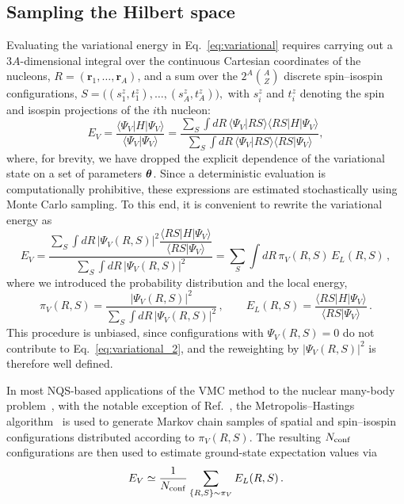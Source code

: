 \subsection{Sampling the Hilbert space }
Evaluating the variational energy in Eq.~\eqref{eq:variational} requires
carrying out a $3A$-dimensional integral over the continuous Cartesian
coordinates of the nucleons,
$R = (\mathbf{r}_1, \ldots, \mathbf{r}_A)$,
and a sum over the $2^A \binom{A}{Z}$ discrete spin--isospin configurations,
$S=\big((s_1^z, t_1^z), \ldots, (s_A^z, t_A^z)\big),$
with $s_i^z$ and $t_i^z$ denoting the spin and isospin projections of the $i$th nucleon:
\begin{equation}
E_V =
\frac{\langle \Psi_V | H | \Psi_V \rangle}{\langle \Psi_V | \Psi_V\rangle}
= \frac{\sum_{S} \int dR\, \langle \Psi_V | R S\rangle \langle R S | H | \Psi_V\rangle}
{\sum_{S} \int dR\, \langle \Psi_V | R S\rangle \langle R S | \Psi_V\rangle},
\label{eq:variational_2}
\end{equation}
where, for brevity, we have dropped the explicit dependence of the variational state on a set of parameters $\boldsymbol{\theta}$. Since a deterministic evaluation is computationally prohibitive, these expressions are estimated stochastically using Monte Carlo sampling. To this end, it is convenient to rewrite the variational energy as
\begin{equation}
E_V
= \frac{\sum_{S} \int dR\, |\Psi_V(R,S)|^2 \dfrac{\langle R S | H | \Psi_V \rangle}
{\langle R S | \Psi_V \rangle}}
{\sum_{S} \int dR\, |\Psi_V(R,S)|^2}
= \sum_{S} \int dR\, \pi_V(R,S)\, E_L(R,S)\,,
\label{eq:en_exp}
\end{equation}
where we introduced the probability distribution and the local energy,
\begin{equation}
\pi_V(R,S) =
\frac{|\Psi_V(R,S)|^2}{\sum_{S} \int dR\, |\Psi_V(R,S)|^2}\,,
\qquad
E_L(R,S) =
\frac{\langle R S | H | \Psi_V \rangle}{\langle R S | \Psi_V \rangle}\,.
\end{equation}
This procedure is unbiased, since configurations with
$\Psi_V(R,S)=0$ do not contribute to Eq.~\eqref{eq:variational_2}, and the
reweighting by $|\Psi_V(R,S)|^2$ is therefore well defined.

In most NQS-based applications of the VMC method to the nuclear many-body
problem~\cite{adams_variational_2021,Gnech2021,yang_consistent_2022,Yang:2023rlw,
gnech_distilling_2024}, with the notable exception of
Ref.~\cite{wen_neural-network_2025}, the Metropolis--Hastings
algorithm~\cite{metropolis_equation_1953,hastings_monte_1970} is used to
generate Markov chain samples of spatial and spin--isospin configurations
distributed according to $\pi_V(R,S)$. The resulting $N_{\rm conf}$
configurations are then used to estimate ground-state expectation values via
\begin{equation}
E_V \simeq \frac{1}{N_{\rm conf}} \sum_{\{R,S\}\sim \pi_V} E_L(R,S)\, .
\end{equation}


